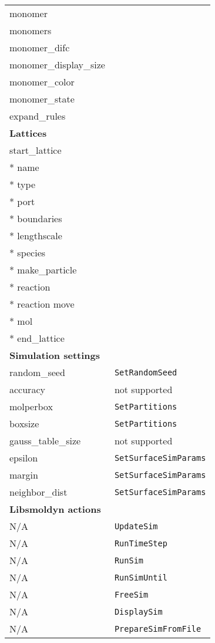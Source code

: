 \documentclass {scrbook}
\newcommand {\ttt} {\texttt}
\begin{document}
\begin{longtable}[c]{ll}
monomer \\ %
monomers \\ %
monomer\_difc \\ %
monomer\_display\_size \\ %
monomer\_color \\ %
monomer\_state \\ %
expand\_rules \\ %
\hline
\multicolumn{2}{l}{\hspace{0.3in}\textbf{Lattices}}\\
\hline
start\_lattice \\ %
{*} name \\ %
{*} type \\ %
{*} port \\ %
{*} boundaries \\ %
{*} lengthscale \\ %
{*} species \\ %
{*} make\_particle \\ %
{*} reaction \\ %
{*} reaction move \\ %
{*} mol \\ %
{*} end\_lattice \\ %
\hline
\multicolumn{2}{l}{\hspace{0.3in}\textbf{Simulation settings}}\\
\hline
random\_seed & \ttt{SetRandomSeed}\\
accuracy & not supported\\
molperbox & \ttt{SetPartitions}\\
boxsize & \ttt{SetPartitions}\\
gauss\_table\_size & not supported\\
epsilon & \ttt{SetSurfaceSimParams}\\
margin & \ttt{SetSurfaceSimParams}\\
neighbor\_dist & \ttt{SetSurfaceSimParams}\\
\hline
\multicolumn{2}{l}{\hspace{0.3in}\textbf{Libsmoldyn actions}}\\
\hline
N/A & \ttt{UpdateSim}\\
N/A & \ttt{RunTimeStep}\\
N/A & \ttt{RunSim}\\
N/A & \ttt{RunSimUntil}\\
N/A & \ttt{FreeSim}\\
N/A & \ttt{DisplaySim}\\
N/A & \ttt{PrepareSimFromFile}\\
\end{longtable}
\end{document}
